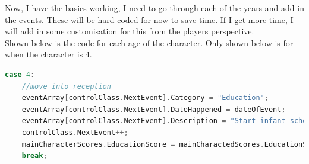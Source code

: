 \noindent Now, I have the basics working, I need to go through each of the years and add in the events. These will be hard coded for now to save time. If I get more time, I will add in some customisation for this from the players perspective.\\
Shown below is the code for each age of the character. Only shown below is for when the character is 4.
\begin{lstlisting}[language=c, style=csharp, caption=First improvement to the education generation procedure]
case 4:
    //move into reception
    eventArray[controlClass.NextEvent].Category = "Education";
    eventArray[controlClass.NextEvent].DateHappened = dateOfEvent;
    eventArray[controlClass.NextEvent].Description = "Start infant school in Reception.";
    controlClass.NextEvent++;
    mainCharacterScores.EducationScore = mainCharactedScores.EducationScore + randomNumber (1,4);
    break;
\end{lstlisting}

